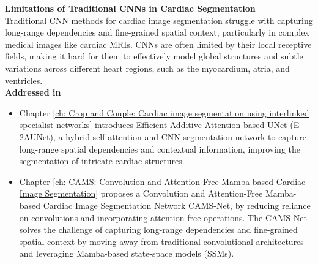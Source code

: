 \noindent\textbf{Limitations of Traditional CNNs in Cardiac Segmentation}\\
Traditional CNN methods for cardiac image segmentation struggle with capturing long-range dependencies and fine-grained spatial context, particularly in complex medical images like cardiac MRIs. CNNs are often limited by their local receptive fields, making it hard for them to effectively model global structures and subtle variations across different heart regions, such as the myocardium, atria, and ventricles.\\
\textbf{Addressed in}
\begin{itemize}
    \item Chapter \ref{ch: Crop and Couple: Cardiac image segmentation using interlinked specialist networks} introduces Efficient Additive Attention-based UNet (E-2AUNet), a hybrid self-attention and CNN segmentation network to capture long-range spatial dependencies and contextual information, improving the segmentation of intricate cardiac structures.
    \item Chapter \ref{ch: CAMS: Convolution and Attention-Free Mamba-based Cardiac Image Segmentation} proposes a Convolution and Attention-Free Mamba-based Cardiac Image Segmentation Network CAMS-Net, by reducing reliance on convolutions and incorporating attention-free operations. The CAMS-Net solves the challenge of capturing long-range dependencies and fine-grained spatial context by moving away from traditional convolutional architectures and leveraging Mamba-based state-space models (SSMs).
\end{itemize}
